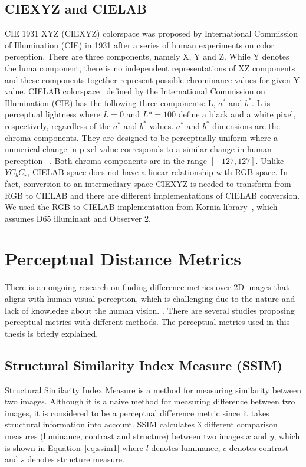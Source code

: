 \subsection{CIEXYZ and CIELAB}
CIE 1931 XYZ (CIEXYZ) colorspace was proposed by International Commission of Illumination (CIE) in 1931 after a series of human experiments on color perception. There are three components, namely X, Y and Z. While Y denotes the luma component, there is no independent representations of XZ components and these components together represent possible chrominance values for given Y value.
CIELAB colorspace~\cite{schanda2007colorimetry} defined by the International Commission on Illumination (CIE) has the following three components: L, \(a^*\) and \(b^*\). L is perceptual lightness where \(L = 0\) and \(L* = 100\) define a black and a white pixel, respectively, regardless of the \(a^*\) and \(b^*\) values. \(a^*\) and \(b^*\) dimensions are the chroma components. They are designed to be perceptually uniform where a numerical change in pixel value corresponds to a similar change in human perception ~\cite{mahy1992luminancevschroma}. Both chroma components are in the range \([-127, 127]\). Unlike \(YC_{b}C_{r}\), CIELAB space does not have a linear relationship with RGB space. In fact, conversion to an intermediary space CIEXYZ is needed to transform from RGB to CIELAB and there are different implementations of CIELAB conversion. We used the RGB to CIELAB implementation from Kornia library~\cite{riba2020kornia}, which assumes D65 illuminant and Observer 2.

\section{Perceptual Distance Metrics}
There is an ongoing research on finding difference metrics over 2D images that aligns with human visual perception, which is challenging due to the nature and lack of knowledge about the human vision. \cite{ding2021comparison}. There are several studies proposing perceptual metrics with different methods. The perceptual metrics used in this thesis is briefly explained.

\subsection{Structural Similarity Index Measure (SSIM)}
Structural Similarity Index Measure is a method for measuring similarity between two images. Although it is a naive method for measuring difference between two images, it is considered to be a perceptual difference metric since it takes structural information into account. SSIM calculates 3 different comparison measures (luminance, contrast and structure) between two images $x$ and $y$, which is shown in Equation~\ref{eq:ssim1} where $l$ denotes luminance, $c$ denotes contrast and $s$ denotes structure measure.

